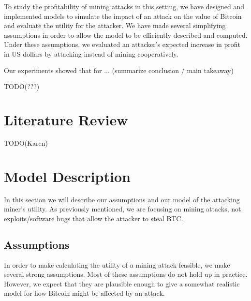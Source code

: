 \documentclass[12pt]{article}
\begin{document}
To study the profitability of mining attacks in this setting, we have designed and implemented models to simulate the impact of an attack on the value of Bitcoin and evaluate the utility for the attacker.
We have made several simplifying assumptions in order to allow the model to be efficiently described and computed.
Under these assumptions, we evaluated an attacker's expected increase in profit in US dollars by attacking instead of mining cooperatively.

Our experiments showed that for ...  (summarize conclusion / main takeaway)

TODO(???)


\section{Literature Review}

TODO(Karen)

\section{Model Description}

In this section we will describe our assumptions and our model of the attacking miner's utility.
As previously mentioned, we are focusing on mining attacks, not exploits/software bugs that allow the attacker to steal BTC.

\subsection{Assumptions}\label{section:assumptions}

In order to make calculating the utility of a mining attack feasible, we make several strong assumptions.
Most of these assumptions do not hold up in practice.
However, we expect that they are plausible enough to give a somewhat realistic model for how Bitcoin might be affected by an attack.
\end{document}
